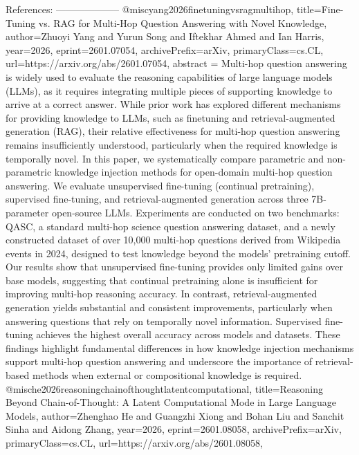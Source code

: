         References:
        --------------------
        @misc{yang2026finetuningvsragmultihop,
      title={Fine-Tuning vs. RAG for Multi-Hop Question Answering with Novel Knowledge}, 
      author={Zhuoyi Yang and Yurun Song and Iftekhar Ahmed and Ian Harris},
      year={2026},
      eprint={2601.07054},
      archivePrefix={arXiv},
      primaryClass={cs.CL},
      url={https://arxiv.org/abs/2601.07054},
      abstract = {Multi-hop question answering is widely used to evaluate the reasoning capabilities of large language models (LLMs), as it requires integrating multiple pieces of supporting knowledge to arrive at a correct answer. While prior work has explored different mechanisms for providing knowledge to LLMs, such as finetuning and retrieval-augmented generation (RAG), their relative effectiveness for multi-hop question answering remains insufficiently understood, particularly when the required knowledge is temporally novel.   In this paper, we systematically compare parametric and non-parametric knowledge injection methods for open-domain multi-hop question answering. We evaluate unsupervised fine-tuning (continual pretraining), supervised fine-tuning, and retrieval-augmented generation across three 7B-parameter open-source LLMs. Experiments are conducted on two benchmarks: QASC, a standard multi-hop science question answering dataset, and a newly constructed dataset of over 10,000 multi-hop questions derived from Wikipedia events in 2024, designed to test knowledge beyond the models' pretraining cutoff.   Our results show that unsupervised fine-tuning provides only limited gains over base models, suggesting that continual pretraining alone is insufficient for improving multi-hop reasoning accuracy. In contrast, retrieval-augmented generation yields substantial and consistent improvements, particularly when answering questions that rely on temporally novel information. Supervised fine-tuning achieves the highest overall accuracy across models and datasets. These findings highlight fundamental differences in how knowledge injection mechanisms support multi-hop question answering and underscore the importance of retrieval-based methods when external or compositional knowledge is required.}
}@misc{he2026reasoningchainofthoughtlatentcomputational,
      title={Reasoning Beyond Chain-of-Thought: A Latent Computational Mode in Large Language Models}, 
      author={Zhenghao He and Guangzhi Xiong and Bohan Liu and Sanchit Sinha and Aidong Zhang},
      year={2026},
      eprint={2601.08058},
      archivePrefix={arXiv},
      primaryClass={cs.CL},
      url={https://arxiv.org/abs/2601.08058},
}
